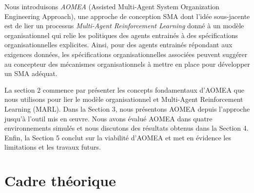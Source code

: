 \documentclass[contribution]{jfsma}
\begin{document}
Nous introduisons \emph{AOMEA} (Assisted Multi-Agent System Organization Engineering Approach), une approche de conception SMA dont l'idée sous-jacente est de lier un processus \emph{Multi-Agent Reinforcement Learning} donné à un modèle organisationnel qui relie les politiques des agents entrainés à des spécifications organisationnelles explicites. Ainsi, pour des agents entrainés répondant aux exigences données, les spécifications organisationnelles associées peuvent suggérer au concepteur des mécanismes organisationnels à mettre en place pour développer un SMA adéquat.%



La section 2 commence par présenter les concepts fondamentaux d'AOMEA que nous utilisons pour lier le modèle organisationnel et Multi-Agent Reinforcement Learning (MARL).
Dans la Section 3, nous présentons AOMEA depuis l’approche jusqu’à l’outil mis en œuvre. Nous avons évalué AOMEA dans quatre environnements simulés et nous discutons des résultats obtenus dans la Section 4. Enfin, la Section 5 conclut sur la viabilité d'AOMEA et met en évidence les limitations et les travaux futurs.


\section{Cadre théorique}
\end{document}
